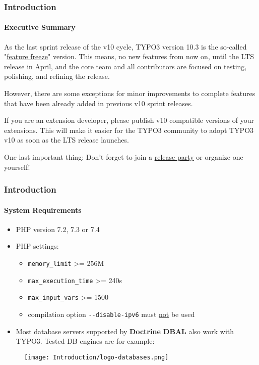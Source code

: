 \begin{frame}[fragile]
	\frametitle{Introduction}
	\framesubtitle{Executive Summary}

	\small
		As the last sprint release of the v10 cycle, TYPO3 version 10.3 is the so-called
		"\href{https://typo3.org/article/land-ho-feature-freeze-ahead}{feature freeze}"
		version. This means, no new features from now on, until the LTS release in April,
		and the core team and all contributors are focused on testing, polishing, and
		refining the release.

		\vspace{0.2cm}

		However, there are some exceptions for minor improvements to complete features
		that have been already added in previous v10 sprint releases.

		\vspace{0.2cm}

		If you are an extension developer, please publish v10 compatible versions of your
		extensions. This will make it easier for the TYPO3 community to adopt TYPO3 v10 as
		soon as the LTS release launches.

		\vspace{0.2cm}

		One last important thing: Don't forget to join a
		\href{https://typo3.org/community/events/v10-parties}{release party}
		or organize one yourself!

	\normalsize

\end{frame}


\begin{frame}[fragile]
	\frametitle{Introduction}
	\framesubtitle{System Requirements}

	\begin{itemize}
		\item PHP version 7.2, 7.3 or 7.4
		\item PHP settings:

			\begin{itemize}
				\item \texttt{memory\_limit} >= 256M
				\item \texttt{max\_execution\_time} >= 240s
				\item \texttt{max\_input\_vars} >= 1500
				\item compilation option \texttt{-}\texttt{-disable-ipv6} must \underline{not} be used
			\end{itemize}

		\item Most database servers supported by \textbf{Doctrine DBAL} also work with TYPO3.
			Tested DB engines are for example:
	\end{itemize}

	\begin{figure}
		\texttt{[image: Introduction/logo-databases.png]}
	\end{figure}

\end{frame}

